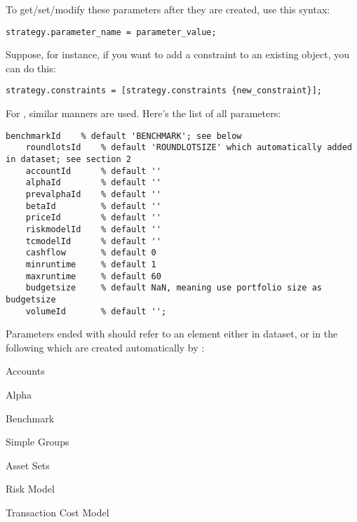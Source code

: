 To get/set/modify these parameters after they are created, use this syntax:
\begin{lstlisting}[numbers=none]
   strategy.parameter_name = parameter_value;
\end{lstlisting}

Suppose, for instance, if you want to add a constraint to an existing  object, you can do this:
\begin{lstlisting}[numbers=none]
   strategy.constraints = [strategy.constraints {new_constraint}];
\end{lstlisting}


For , similar manners are used.
Here's the list of all parameters:
\begin{lstlisting}[numbers=none]
    benchmarkId    % default 'BENCHMARK'; see below
    roundlotsId    % default 'ROUNDLOTSIZE' which automatically added in dataset; see section 2
    accountId      % default ''
    alphaId        % default ''
    prevalphaId    % default ''
    betaId         % default ''
    priceId        % default ''
    riskmodelId    % default ''
    tcmodelId      % default ''
    cashflow       % default 0
    minruntime     % default 1
    maxruntime     % default 60
    budgetsize     % default NaN, meaning use portfolio size as budgetsize
    volumeId       % default '';
\end{lstlisting}

Parameters ended with  should refer to an element
either in dataset, or in the following which are created automatically by \axioma{}:

\begin{argdesc}
   \item [Accounts]  
   \item [Alpha]     
   \item [Benchmark] 
   \item [Simple Groups] 
   \item [Asset Sets] 
   \item [Risk Model] 
   \item [Transaction Cost Model] 
\end{argdesc}

